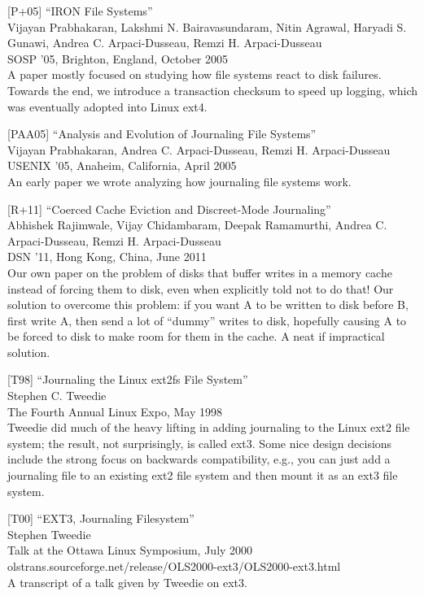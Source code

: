 {[}P+05{]} ``IRON File Systems''\\
Vijayan Prabhakaran, Lakshmi N. Bairavasundaram, Nitin Agrawal, Haryadi
S. Gunawi, Andrea C. Arpaci-Dusseau, Remzi H. Arpaci-Dusseau\\
SOSP '05, Brighton, England, October 2005\\
A paper mostly focused on studying how file systems react to disk
failures. Towards the end, we introduce a transaction checksum to speed
up logging, which was eventually adopted into Linux ext4.

{[}PAA05{]} ``Analysis and Evolution of Journaling File Systems''\\
Vijayan Prabhakaran, Andrea C. Arpaci-Dusseau, Remzi H. Arpaci-Dusseau\\
USENIX '05, Anaheim, California, April 2005\\
An early paper we wrote analyzing how journaling file systems work.

{[}R+11{]} ``Coerced Cache Eviction and Discreet-Mode Journaling''\\
Abhishek Rajimwale, Vijay Chidambaram, Deepak Ramamurthi, Andrea C.
Arpaci-Dusseau, Remzi H. Arpaci-Dusseau\\
DSN '11, Hong Kong, China, June 2011\\
Our own paper on the problem of disks that buffer writes in a memory
cache instead of forcing them to disk, even when explicitly told not to
do that! Our solution to overcome this problem: if you want A to be
written to disk before B, first write A, then send a lot of ``dummy''
writes to disk, hopefully causing A to be forced to disk to make room
for them in the cache. A neat if impractical solution.

{[}T98{]} ``Journaling the Linux ext2fs File System''\\
Stephen C. Tweedie\\
The Fourth Annual Linux Expo, May 1998\\
Tweedie did much of the heavy lifting in adding journaling to the Linux
ext2 file system; the result, not surprisingly, is called ext3. Some
nice design decisions include the strong focus on backwards
compatibility, e.g., you can just add a journaling file to an existing
ext2 file system and then mount it as an ext3 file system.

{[}T00{]} ``EXT3, Journaling Filesystem''\\
Stephen Tweedie\\
Talk at the Ottawa Linux Symposium, July 2000\\
olstrans.sourceforge.net/release/OLS2000-ext3/OLS2000-ext3.html\\
A transcript of a talk given by Tweedie on ext3.

